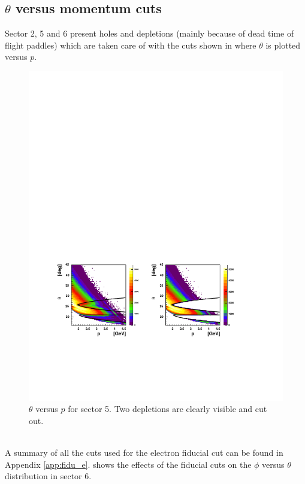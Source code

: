 \subsection{  $\theta$ versus momentum cuts}
Sector 2, 5 and 6 present holes and depletions (mainly because of dead time of flight paddles)
which are taken care of with the 
cuts shown in  where $\theta$ is plotted versus $p$.
\begin{figure}[h]
 \begin{center}
 \includegraphics[width = 14cm, bb=60 140 500 380]{data_reduction/img/electron_tp5}  
  \caption[$\theta$ versus $p$ for sector 5]
          { $\theta$ versus $p$ for sector 5. Two depletions are clearly visible and cut out.}
 \label{fig:fidu_etp5}
 \end{center}
\end{figure}
\\
A summary of all the cuts used for the electron fiducial cut can be found in Appendix \ref{app:fidu_e}.
 shows the    effects of the fiducial cuts on the $\phi$
versus $\theta$ distribution in sector 6.

